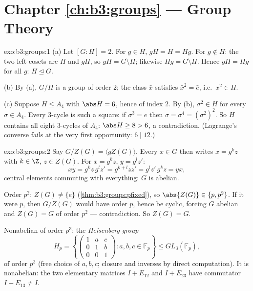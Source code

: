 \section*{Chapter \ref{ch:b3:groups} --- Group Theory}

\begin{solution}{exo:b3:groups:1}
(a) Let $[G:H] = 2$. For $g \in H$, $gH = H = Hg$. For $g \notin
H$: the two left cosets are $H$ and $gH$, so $gH = G \setminus H$;
likewise $Hg = G \setminus H$. Hence $gH = Hg$ for all $g$: $H
\trianglelefteq G$.

(b) By (a), $G/H$ is a group of order $2$; the class $\bar x$
satisfies $\bar x^2 = \bar e$, i.e.\ $x^2 \in H$.

(c) Suppose $H \leq A_4$ with $\abs H = 6$, hence of index $2$. By
(b), $\sigma^2 \in H$ for every $\sigma \in A_4$. Every $3$-cycle
is such a square: if $\sigma^3 = e$ then $\sigma =
\sigma^4 = (\sigma^2)^2$. So $H$ contains all eight $3$-cycles of
$A_4$: $\abs H \geq 8 > 6$, a contradiction. (Lagrange's converse
fails at the very first opportunity: $6 \mid 12$.)
\end{solution}

\begin{solution}{exo:b3:groups:2}
Say $G/Z(G) = \langle gZ(G) \rangle$. Every $x \in G$ then writes
$x = g^k z$ with $k \in \Z$, $z \in Z(G)$. For $x = g^kz$, $y =
g^l z'$:
\[
xy = g^k z\, g^l z' = g^{k+l} z z' = g^l z'\, g^k z = yx,
\]
central elements commuting with everything: $G$ is abelian.

Order $p^2$: $Z(G) \neq \{e\}$ (\cref{thm:b3:groups:pfixed}), so
$\abs{Z(G)} \in \{p, p^2\}$. If it were $p$, then $G/Z(G)$ would
have order $p$, hence be cyclic, forcing $G$ abelian and $Z(G) =
G$ of order $p^2$ --- contradiction. So $Z(G) = G$.

Nonabelian of order $p^3$: the \emph{Heisenberg group}
\[
H_p = \left\{ \begin{pmatrix} 1 & a & c\\ 0 & 1 & b\\ 0 & 0 & 1
\end{pmatrix} : a, b, c \in \mathbb F_p \right\}
\leq GL_3(\mathbb F_p),
\]
of order $p^3$ (free choice of $a, b, c$; closure and inverses by
direct computation). It is nonabelian: the two elementary matrices
$I + E_{12}$ and $I + E_{23}$ have commutator $I + E_{13} \neq I$.
\end{solution}

